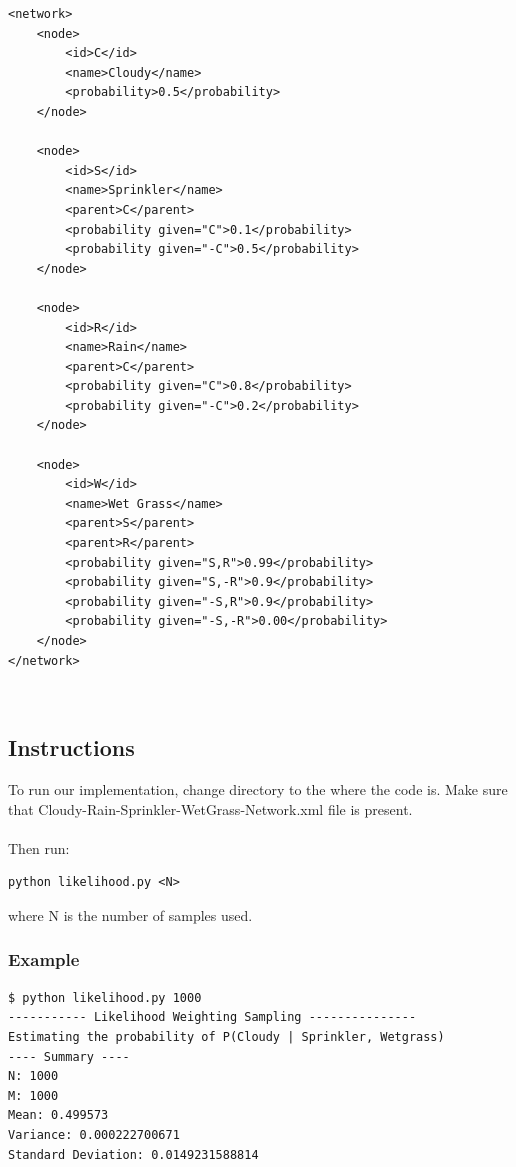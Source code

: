 \documentclass{article}
\begin{document}
\begin{minipage}{\linewidth}
\begin{lstlisting}
<network>
	<node>
		<id>C</id>
		<name>Cloudy</name>
		<probability>0.5</probability>
	</node>

	<node>
		<id>S</id>
		<name>Sprinkler</name>
		<parent>C</parent>
		<probability given="C">0.1</probability>
		<probability given="-C">0.5</probability>
	</node>
	
	<node>
		<id>R</id>
		<name>Rain</name>
		<parent>C</parent>
		<probability given="C">0.8</probability>
		<probability given="-C">0.2</probability>
	</node>
	
	<node>
		<id>W</id>
		<name>Wet Grass</name>
		<parent>S</parent>
		<parent>R</parent>
		<probability given="S,R">0.99</probability>
		<probability given="S,-R">0.9</probability>
		<probability given="-S,R">0.9</probability>
		<probability given="-S,-R">0.00</probability>
	</node>
</network>
\end{lstlisting}
\end{minipage}\\

\subsection{Instructions}
To run our implementation, change directory to the where the code is. Make sure that Cloudy-Rain-Sprinkler-WetGrass-Network.xml file is present.\\
\\
Then run:

\begin{lstlisting}
python likelihood.py <N>
\end{lstlisting}
where N is the number of samples used.\\

\subsubsection{Example}
\begin{lstlisting}
$ python likelihood.py 1000
----------- Likelihood Weighting Sampling ---------------
Estimating the probability of P(Cloudy | Sprinkler, Wetgrass)
---- Summary ----
N: 1000
M: 1000
Mean: 0.499573
Variance: 0.000222700671
Standard Deviation: 0.0149231588814

\end{lstlisting}
\end{document}
